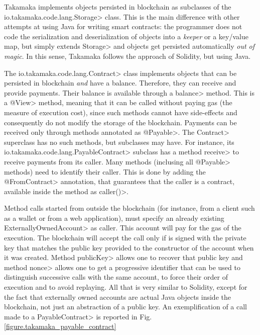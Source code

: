 Takamaka implements objects persisted in blockchain as subclasses of the
\<io.takamaka.code.lang.Storage> class.
This is the main difference with other attempts at using Java for writing smart contracts:
the programmer does not code the serialization and deserialization of objects into
a \emph{keeper} or a key/value map, but simply extends \<Storage> and objects get
persisted automatically \emph{out of magic}. In this sense, Takamaka follows the approach of
Solidity, but using Java.

The \<io.takamaka.code.lang.Contract> class implements objects that can be
persisted in blockchain \emph{and} have a balance. Therefore, they can receive and provide payments.
Their balance is available through a \<balance> method. This is a \<@View> method, meaning
that it can be called without paying gas (the measure of execution cost), since such methods
cannot have side-effects and consequently do not modify the storage of the blockchain.
Payments can be received only through methods annotated as \<@Payable>.
The \<Contract> superclass has no such methods, but subclasses may have.
For instance, its \<io.takamaka.code.lang.PayableContract> subclass has
a method \<receive> to receive payments from its caller. Many methods (inclusing all
\<@Payable> methods) need to identify their caller. This is done by adding the
\<@FromContract> annotation, that guarantees that the caller is a contract, available
inside the method as \<caller()>.

Method calls started from outside the blockchain (for instance, from a client such as a wallet
or from a web application), must specify an already existing \<ExternallyOwnedAccount>
as caller. This account will pay for the gas of the execution. The blockchain will accept
the call only if is signed with the private key that matches the public key provided to
the constructor of the account when it was created. Method \<publicKey> allows one to
recover that public key and method \<nonce> allows one to get a progressive identifier that
can be used to distinguish successive calls with the same account, to force their order
of execution and to avoid replaying.
All that is very similar to Solidity, except for the fact that externally owned accounts
are actual Java objects inside the blockchain, not just an abstraction of a public key. An exemplification of a call made to a \<PayableContract> is reported in Fig.\,\ref{figure.takamaka_payable_contract}

